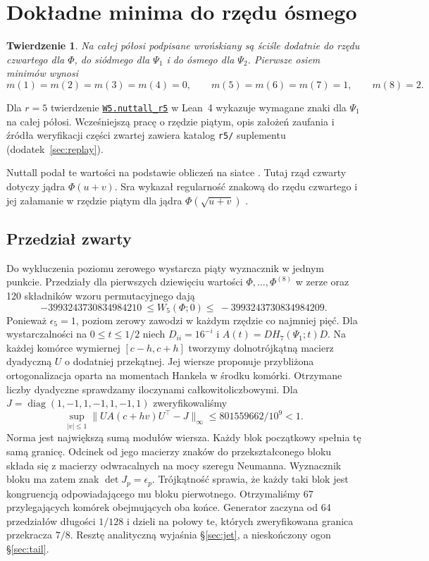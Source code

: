 \documentclass[11pt,a4paper,reqno]{amsart}
\newtheorem{theorem}{Twierdzenie}[section]
\numberwithin{equation}{section}
\begin{document}
\section{Dokładne minima do rzędu ósmego}\label{sec:exact}


\begin{theorem}\label{th:exact}
Na całej półosi podpisane wrońskiany są ściśle dodatnie do rzędu czwartego dla \(\Phi\), do siódmego dla \(\Psi_1\) i do ósmego dla \(\Psi_2\). Pierwsze osiem minimów wynosi
\[m(1)=m(2)=m(3)=m(4)=0,\qquad m(5)=m(6)=m(7)=1,\qquad m(8)=2.\]
\end{theorem}

Dla \(r=5\) twierdzenie \href{https://github.com/janchojnacki96-netizen/nuttall-r5-lean-proof/blob/dfaede6d37bb019d97a223d500cbade407e0f994/W5/NuttallR5.lean}{\texttt{W5.nuttall\_r5}} w Lean~4 wykazuje wymagane znaki dla \(\Psi_1\) na całej półosi. Wcześniejszą pracę o rzędzie piątym, opis założeń zaufania i źródła weryfikacji części zwartej zawiera katalog \texttt{r5/} suplementu (dodatek~\ref{sec:replay}).


Nuttall podał te wartości na podstawie obliczeń na siatce \cite[\S4.7]{nuttall}. Tutaj rząd czwarty dotyczy jądra \(\Phi(u+v)\). Sra wykazał regularność znakową do rzędu czwartego i jej załamanie w rzędzie piątym dla jądra \(\Phi(\sqrt{u+v})\) \cite{sra4}.

\subsection{Przedział zwarty}\label{sec:compact}


Do wykluczenia poziomu zerowego wystarcza piąty wyznacznik w jednym punkcie. Przedziały dla pierwszych dziewięciu wartości \(\Phi,\ldots,\Phi^{(8)}\) w zerze oraz 120 składników wzoru permutacyjnego dają \[-3993243730834984210\ \le W_5(\Phi;0)\le\ -3993243730834984209.\] Ponieważ \(\epsilon_5=1\), poziom zerowy zawodzi w każdym rzędzie co najmniej pięć. Dla wystarczalności na \(0\le t\le1/2\) niech \(D_{ii}=16^{-i}\) i \(A(t)=D H_7(\Psi_1;t)D\). Na każdej komórce wymiernej \([c-h,c+h]\) tworzymy dolnotrójkątną macierz dyadyczną \(U\) o dodatniej przekątnej. Jej wiersze proponuje przybliżona ortogonalizacja oparta na momentach Hankela w środku komórki. Otrzymane liczby dyadyczne sprawdzamy iloczynami całkowitoliczbowymi. Dla \(J=\operatorname{diag}(1,-1,1,-1,1,-1,1)\) zweryfikowaliśmy 
\begin{equation}\label{eq:cell}
\sup_{|v|\le1}\|U A(c+hv)U^\top-J\|_\infty
 \le 801559662/10^9<1.
\end{equation}
 Norma jest największą sumą modułów wiersza. Każdy blok początkowy spełnia tę samą granicę. Odcinek od jego macierzy znaków do przekształconego bloku składa się z macierzy odwracalnych na mocy szeregu Neumanna. Wyznacznik bloku ma zatem znak \(\det J_p=\epsilon_p\). Trójkątność sprawia, że każdy taki blok jest kongruencją odpowiadającego mu bloku pierwotnego. Otrzymaliśmy 67 przylegających komórek obejmujących oba końce. Generator zaczyna od 64 przedziałów długości \(1/128\) i dzieli na połowy te, których zweryfikowana granica przekracza \(7/8\). Resztę analityczną wyjaśnia \S\ref{sec:jet}, a nieskończony ogon \S\ref{sec:tail}.
\end{document}
